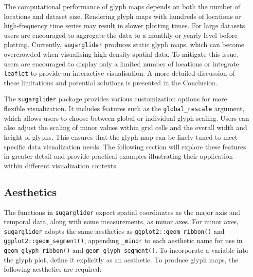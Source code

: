 The computational performance of glyph maps depends on both the number of locations and dataset size. Rendering glyph maps with hundreds of locations or high-frequency time series may result in slower plotting times. For large datasets, users are encouraged to aggregate the data to a monthly or yearly level before plotting. Currently, \texttt{sugarglider} produces static glyph maps, which can become overcrowded when visualising high-density spatial data. To mitigate this issue, users are encouraged to display only a limited number of locations or integrate \texttt{leaflet} to provide an interactive visualisation. A more detailed discussion of these limitations and potential solutions is presented in the Conclusion.

The \texttt{sugarglider} package provides various customization options for more flexible visualization. It includes features such as the \texttt{global\_rescale} argument, which allows users to choose between global or individual glyph scaling. Users can also adjust the scaling of minor values within grid cells and the overall width and height of glyphs. This ensures that the glyph map can be finely tuned to meet specific data visualization needs. The following section will explore these features in greater detail and provide practical examples illustrating their application within different visualization contexts.

\hypertarget{aesthetics}{%
\subsection{Aesthetics}\label{aesthetics}}

The functions in \texttt{sugarglider} expect spatial coordinates as the major axis and temporal data, along with some measurements, as minor axes. For minor axes, \texttt{sugarglider} adopts the same aesthetics as \texttt{ggplot2::geom\_ribbon()} and \texttt{ggplot2::geom\_segment()}, appending \texttt{\_minor} to each aesthetic name for use in \texttt{geom\_glyph\_ribbon()} and \texttt{geom\_glyph\_segment()}. To incorporate a variable into the glyph plot, define it explicitly as an aesthetic. To produce glyph maps, the following aesthetics are required:

